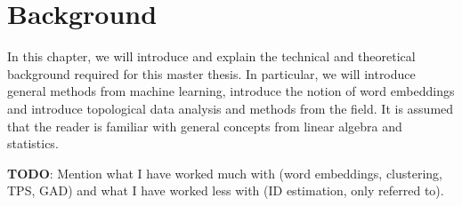 \chapter{Background}
In this chapter, we will introduce and explain the technical and theoretical background required for this master thesis. In particular, we will introduce general methods from machine learning, introduce the notion of word embeddings and introduce topological data analysis and methods from the field. It is assumed that the reader is familiar with general concepts from linear algebra and statistics.

\textbf{TODO}:
Mention what I have worked much with (word embeddings, clustering, TPS, GAD) and what I have worked less with (ID estimation, only referred to).



